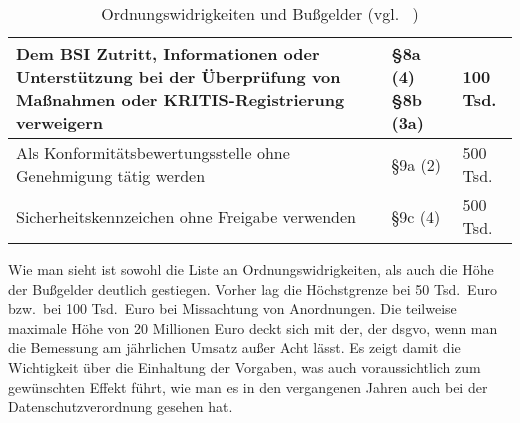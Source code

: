 \begin{sidewaystable}[htp]
\begin{tabular}{@{}p{}p{}p{}@{}}
        Dem BSI Zutritt, Informationen oder Unterstützung bei der Überprüfung von Maßnahmen oder KRITIS-Registrierung verweigern & §8a (4) §8b (3a)                                                    & 100 Tsd.                                                 \\ \midrule
        Als Konformitäts­bewertungsstelle ohne Genehmigung tätig werden                                                          & §9a (2)                                                             & 500 Tsd.                                                 \\ \midrule
        Sicherheitskennzeichen ohne Freigabe verwenden                                                                           & §9c (4)                                                             & 500 Tsd.                                                 \\ \bottomrule
    \end{tabular}
    \caption{Ordnungswidrigkeiten und Bußgelder (vgl. ~\cite{bussgelder-in-kritis,neue-it-sig-2.0}) }
    \label{tab:ordnungswidrigkeiten}
\end{sidewaystable}

Wie man sieht ist sowohl die Liste an Ordnungswidrigkeiten, als auch die Höhe der Bußgelder deutlich gestiegen.
Vorher lag die Höchstgrenze bei 50 Tsd.\ Euro bzw.\ bei 100 Tsd.\ Euro bei Missachtung von Anordnungen.
Die teilweise maximale Höhe von 20 Millionen Euro deckt sich mit der, der \acrshort{dsgvo},
wenn man die Bemessung am jährlichen Umsatz außer Acht lässt.
Es zeigt damit die Wichtigkeit über die Einhaltung der Vorgaben, was auch voraussichtlich zum gewünschten Effekt führt,
wie man es in den vergangenen Jahren auch bei der Datenschutzverordnung gesehen hat.
